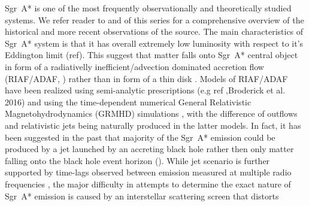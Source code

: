Sgr~A* is one of the most frequently observationally and theoretically studied systems.  We refer reader to  and  of this series for a comprehensive overview of the historical and more recent observations of the source. The main characteristics of Sgr~A* system is that it has overall extremely low luminosity with respect to it's Eddington limit (ref). This suggest that matter falls onto Sgr~A* central object in form of a radiativelly inefficient/advection dominated accretion flow (RIAF/ADAF, \citealt{1977ApJ...214..840I,1994ApJ...428L..13N, 1995ApJ...444..231N,
  1995ApJ...452..710N, 1996A&AS..120C.287N, 1998ApJ...492..554N}) rather than in form of a thin disk \citep{1973A&A....24..337S}. Models of RIAF/ADAF have been realized using semi-analytic prescriptions (e.g ref ,Broderick et al. 2016) and using the time-dependent numerical General Relativistic Magnetohydrodynamics (GRMHD) simulations \citep[e.g.,][]{2000ApJ...528..462H, 2003ApJ...589..458D,
  2003ApJ...589..444G, 2007CQGra..24S.235G, 2012ApJS..201....9F,
  2014ApJ...796...22F, 2016ApJS..225...22W, 2017ApJS..231...17A,
  2018JPhCS1031a2008O, 2019A&A...629A..61O, 2019ApJS..243...26P}, with the difference of outflows and
relativistic jets being naturally produced in the latter models. In fact, it has been suggested in the past that majority of the Sgr~A* emission could be produced by a jet launched by an accreting black hole rather then only matter falling onto the black hole event horizon (\citealt{2000A&A...362..113F,2004A&A...414..895F, 2005ApJ...635.1203M, 2013A&A...559L...3M}). While jet scenario is further supported by time-lags observed between emission measured at multiple radio frequencies \citep{2015A&A...576A..41B,2021arXiv210713402B}, the major difficulty in attempts to determine the exact nature of Sgr~A* emission is caused by an interstellar scattering screen that distorts

